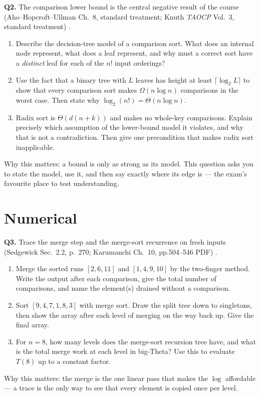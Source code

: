 \documentclass[11pt]{article}
\begin{document}
\textbf{Q2.} The comparison lower bound is the central negative result of the course (Aho--Hopcroft--Ullman Ch.~8, standard treatment; Knuth \emph{TAOCP} Vol.~3, standard treatment) \cite{AhoHopcroftUllman1983_data_structures_algorithms,Knuth1998_taocp_volume3}.
\begin{enumerate}
  \item[(a)] Describe the decision-tree model of a comparison sort. What does an internal node represent, what does a leaf represent, and why must a correct sort have a \emph{distinct} leaf for each of the $n!$ input orderings?
  \item[(b)] Use the fact that a binary tree with $L$ leaves has height at least $\lceil\log_2 L\rceil$ to show that every comparison sort makes $\Omega(n\log n)$ comparisons in the worst case. Then state why $\log_2(n!)=\Theta(n\log n)$.
  \item[(c)] Radix sort is $\Theta(d(n+k))$ and makes no whole-key comparisons. Explain precisely which assumption of the lower-bound model it violates, and why that is not a contradiction. Then give one precondition that makes radix sort inapplicable.
\end{enumerate}
Why this matters: a bound is only as strong as its model. This question asks you to state the model, use it, and then say exactly where its edge is --- the exam's favourite place to test understanding.

\section{Numerical}

\textbf{Q3.} Trace the merge step and the merge-sort recurrence on fresh inputs (Sedgewick Sec.~2.2, p.~270; Karumanchi Ch.~10, pp.504--546 PDF) \cite{Sedgewick2011_algorithms,Karumanchi2017_data_structures_algorithms_made_easy}.
\begin{enumerate}
  \item[(a)] Merge the sorted runs $[2,6,11]$ and $[1,4,9,10]$ by the two-finger method. Write the output after each comparison, give the total number of comparisons, and name the element(s) drained without a comparison.
  \item[(b)] Sort $[9,4,7,1,8,3]$ with merge sort. Draw the split tree down to singletons, then show the array after each level of merging on the way back up. Give the final array.
  \item[(c)] For $n=8$, how many levels does the merge-sort recursion tree have, and what is the total merge work at each level in big-Theta? Use this to evaluate $T(8)$ up to a constant factor.
\end{enumerate}
Why this matters: the merge is the one linear pass that makes the $\log$ affordable --- a trace is the only way to see that every element is copied once per level.
\end{document}
